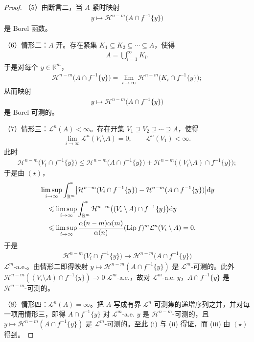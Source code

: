\documentclass[../../main.tex]{subfiles}%
\begin{document}
\begin{proof}
（5）由断言二，当 $A$ 紧时映射
\begin{align*}
y\mapsto\mathcal{H}^{n-m}\bigl(A\cap f^{-1}\{y\}\bigr)
\end{align*}
是 Borel 函数。

（6）情形二：$A$ 开。存在紧集 $K_1\subseteq K_2\subseteq\cdots\subseteq A$，使得
\begin{align*}
A=\bigcup_{i=1}^{\infty}K_i.
\end{align*}
于是对每个 $y\in\mathbb{R}^m$，
\begin{align*}
\mathcal{H}^{n-m}\bigl(A\cap f^{-1}\{y\}\bigr)=\lim_{i\to\infty}\mathcal{H}^{n-m}\bigl(K_i\cap f^{-1}\{y\}\bigr);
\end{align*}
从而映射
\begin{align*}
y\mapsto\mathcal{H}^{n-m}\bigl(A\cap f^{-1}\{y\}\bigr)
\end{align*}
是 Borel 可测的。

（7）情形三：$\mathcal{L}^n(A)<\infty$。存在开集 $V_1\supseteq V_2\supseteq\cdots\supseteq A$，使得
\begin{align*}
\lim_{i\to\infty}\mathcal{L}^n(V_i\setminus A)=0,\qquad\mathcal{L}^n(V_1)<\infty.
\end{align*}
此时
\begin{align*}
\mathcal{H}^{n-m}\bigl(V_i\cap f^{-1}\{y\}\bigr)\leqslant\mathcal{H}^{n-m}\bigl(A\cap f^{-1}\{y\}\bigr)+\mathcal{H}^{n-m}\bigl((V_i\setminus A)\cap f^{-1}\{y\}\bigr);
\end{align*}
于是由 $(\star)$，
\begin{align*}
&\limsup_{i\to\infty}\int^{*}_{\mathbb{R}^m}\bigl|\mathcal{H}^{n-m}(V_i\cap f^{-1}\{y\})-\mathcal{H}^{n-m}(A\cap f^{-1}\{y\})\bigr|\mathrm{d} y\\
&\quad\leqslant\limsup_{i\to\infty}\int^{*}_{\mathbb{R}^m}\mathcal{H}^{n-m}\bigl((V_i\setminus A)\cap f^{-1}\{y\}\bigr)\mathrm{d} y\\
&\quad\leqslant\limsup_{i\to\infty}\frac{\alpha(n-m)\alpha(m)}{\alpha(n)}(\operatorname{Lip} f)^m\mathcal{L}^n(V_i\setminus A)=0.
\end{align*}
于是
\begin{align*}
\mathcal{H}^{n-m}\bigl(V_i\cap f^{-1}\{y\}\bigr)\to\mathcal{H}^{n-m}\bigl(A\cap f^{-1}\{y\}\bigr)
\end{align*}
$\mathcal{L}^m$-a.e.。由情形二即得映射 $y\mapsto\mathcal{H}^{n-m}(A\cap f^{-1}\{y\})$ 是 $\mathcal{L}^m$-可测的。此外 $\mathcal{H}^{n-m}((V_i\setminus A)\cap f^{-1}\{y\})\to0$ $\mathcal{L}^m$-a.e.，故对 $\mathcal{L}^m$-a.e. $y$，$A\cap f^{-1}\{y\}$ 是 $\mathcal{H}^{n-m}$-可测的。

（8）情形四：$\mathcal{L}^n(A)=\infty$。把 $A$ 写成有界 $\mathcal{L}^n$-可测集的递增序列之并，并对每一项用情形三，即得 $A\cap f^{-1}\{y\}$ 对 $\mathcal{L}^m$-a.e. $y$ 是 $\mathcal{H}^{n-m}$-可测的，且 $y\mapsto\mathcal{H}^{n-m}(A\cap f^{-1}\{y\})$ 是 $\mathcal{L}^m$-可测的。至此 (i) 与 (ii) 得证，而 (iii) 由 $(\star)$ 得到。
\end{proof}
\end{document}
